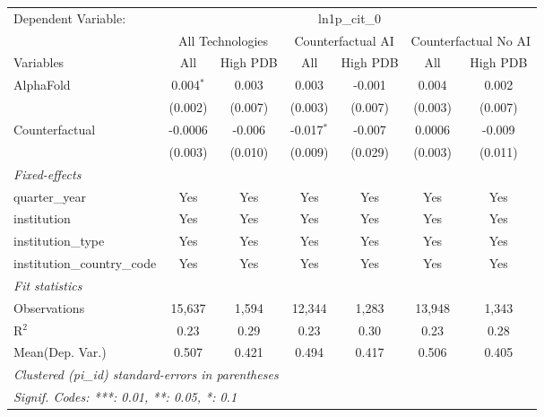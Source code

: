 \begingroup
\centering
\begin{tabular}{lcccccc}
   \tabularnewline \midrule \midrule
   Dependent Variable: & \multicolumn{6}{c}{ln1p\_cit\_0}\\
 & \multicolumn{2}{c}{All Technologies} & \multicolumn{2}{c}{Counterfactual AI} & \multicolumn{2}{c}{Counterfactual No AI} \\
\cmidrule(lr){1-1}\cmidrule(lr){2-3} \cmidrule(lr){4-5} \cmidrule(lr){6-7}
Variables & \multicolumn{1}{c}{All} & \multicolumn{1}{c}{High PDB} & \multicolumn{1}{c}{All} & \multicolumn{1}{c}{High PDB} & \multicolumn{1}{c}{All} & \multicolumn{1}{c}{High PDB} \\
\cmidrule(lr){1-1}\cmidrule(lr){2-2} \cmidrule(lr){3-3} \cmidrule(lr){4-4} \cmidrule(lr){5-5} \cmidrule(lr){6-6} \cmidrule(lr){7-7}
   AlphaFold                    & 0.004$^{*}$ & 0.003   & 0.003        & -0.001  & 0.004   & 0.002\\   
                                & (0.002)     & (0.007) & (0.003)      & (0.007) & (0.003) & (0.007)\\   
   Counterfactual               & -0.0006     & -0.006  & -0.017$^{*}$ & -0.007  & 0.0006  & -0.009\\   
                                & (0.003)     & (0.010) & (0.009)      & (0.029) & (0.003) & (0.011)\\   
   \midrule
   \emph{Fixed-effects}\\
   quarter\_year                & Yes         & Yes     & Yes          & Yes     & Yes     & Yes\\  
   institution                  & Yes         & Yes     & Yes          & Yes     & Yes     & Yes\\  
   institution\_type            & Yes         & Yes     & Yes          & Yes     & Yes     & Yes\\  
   institution\_country\_code   & Yes         & Yes     & Yes          & Yes     & Yes     & Yes\\  
   \midrule
   \emph{Fit statistics}\\
   Observations                 & 15,637      & 1,594   & 12,344       & 1,283   & 13,948  & 1,343\\  
   R$^2$                        & 0.23        & 0.29    & 0.23         & 0.30    & 0.23    & 0.28\\  
Mean(Dep. Var.) & 0.507 & 0.421 & 0.494 & 0.417 & 0.506 & 0.405 \\
   \midrule \midrule
   \multicolumn{7}{l}{\emph{Clustered (pi\_id) standard-errors in parentheses}}\\
   \multicolumn{7}{l}{\emph{Signif. Codes: ***: 0.01, **: 0.05, *: 0.1}}\\
\end{tabular}
\par\endgroup
